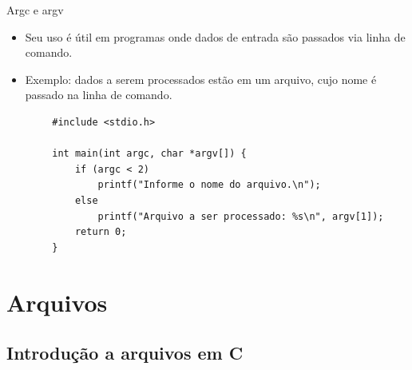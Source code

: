 \documentclass[handout]{beamer}
\begin{document}
\begin{frame}[fragile]{Argc e argv}

    \begin{itemize}
        \item Seu uso é útil em programas onde dados de entrada são passados via linha de comando.
        \item Exemplo: dados a serem processados estão em um arquivo, cujo nome é passado na linha de comando.
    \end{itemize}

    \begin{verbatim}
        #include <stdio.h>

        int main(int argc, char *argv[]) {
            if (argc < 2)
                printf("Informe o nome do arquivo.\n");
            else
                printf("Arquivo a ser processado: %s\n", argv[1]);
            return 0;
        }
    \end{verbatim}

\end{frame}

\section{Arquivos}

\subsection{Introdução a arquivos em C}
\end{document}
